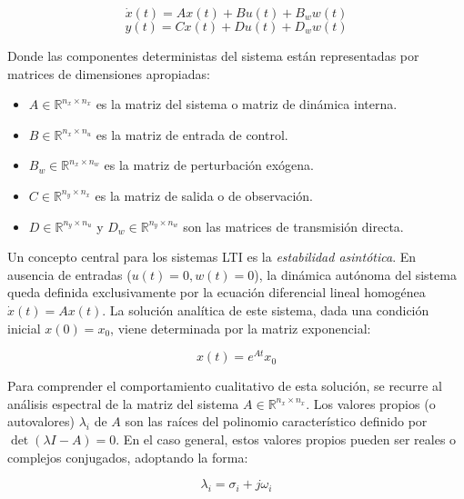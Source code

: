 \begin{equation}
    \dot{x}(t) = A x(t) + B u(t) + B_w w(t)
    \label{eq:estado_lti}
\end{equation}
\begin{equation}
    y(t) = C x(t) + D u(t) + D_w w(t)
    \label{eq:salida_lti}
\end{equation}

Donde las componentes deterministas del sistema están representadas por matrices de dimensiones apropiadas:
\begin{itemize}
    \item $A \in \mathbb{R}^{n_x \times n_x}$ es la matriz del sistema o matriz de dinámica interna.
    \item $B \in \mathbb{R}^{n_x \times n_u}$ es la matriz de entrada de control.
    \item $B_w \in \mathbb{R}^{n_x \times n_w}$ es la matriz de perturbación exógena.
    \item $C \in \mathbb{R}^{n_y \times n_x}$ es la matriz de salida o de observación.
    \item $D \in \mathbb{R}^{n_y \times n_u}$ y $D_w \in \mathbb{R}^{n_y \times n_w}$ son las matrices de transmisión directa.
\end{itemize}

Un concepto central para los sistemas LTI es la \textit{estabilidad asintótica}. En ausencia de entradas ($u(t) = 0, w(t) = 0$), la dinámica autónoma del sistema queda definida exclusivamente por la ecuación diferencial lineal homogénea $\dot{x}(t) = A x(t)$. La solución analítica de este sistema, dada una condición inicial $x(0) = x_0$, viene determinada por la matriz exponencial:

\begin{equation}
    x(t) = e^{At} x_0
    \label{eq:sol_lti}
\end{equation}

Para comprender el comportamiento cualitativo de esta solución, se recurre al análisis espectral de la matriz del sistema $A \in \mathbb{R}^{n_x \times n_x}$. Los valores propios (o autovalores) $\lambda_i$ de $A$ son las raíces del polinomio característico definido por $\det(\lambda I - A) = 0$. En el caso general, estos valores propios pueden ser reales o complejos conjugados, adoptando la forma:

\begin{equation}
    \lambda_i = \sigma_i + j\omega_i
    \label{eq:autovalor_complejo}
\end{equation}

